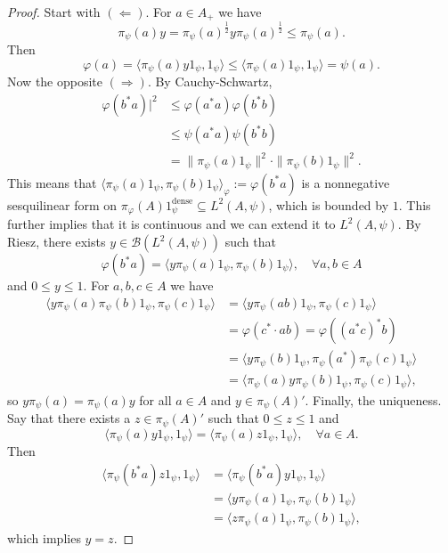 \documentclass[10pt, a4paper]{article}
\newenvironment{noticeC}{%
  \tcolorbox[%
  notitle,
  empty,
  enhanced,  %
  breakable,
  coltext=black, 
  fontupper=\rmfamily,
  noparskip,
  sharp corners,
  boxrule=-1pt,  %
  frame hidden,
  left=7pt,  %
  right=7pt,
  top=5pt,
  bottom=5pt,
  before skip=2.5ex plus 2pt,
  after skip=2.5ex plus 2pt,
  overlay unbroken and last={%
  },
  ]}
{\endtcolorbox}
\newenvironment{myproof}%
  {\begin{noticeC}\begin{proof}}%
  {\end{proof}\end{noticeC}}
\begin{document}
\begin{myproof}
  Start with $(\Leftarrow)$. For $a \in A_+$ we have 
  $$\pi_{\psi} (a) y = \pi_{\psi} (a)^{\frac{1}{2}} y \pi_{\psi} (a) ^{\frac{1}{2}} \leq \pi_{\psi} (a).$$
  Then 
  $$\varphi(a) = \langle \pi_{\psi} (a) y 1_{\psi}, 1_{\psi} \rangle \leq \langle \pi_{\psi} (a) 1_{\psi}, 1_{\psi}\rangle = \psi(a).$$
  Now the opposite $(\Rightarrow)$. By Cauchy-Schwartz,
  \begin{align*}
    \varphi (b^* a)|^2 &\leq \varphi(a^* a) \varphi(b^* b)\\
    &\leq \psi (a^* a) \psi (b^* b)\\
    &= \| \pi_{\psi} (a) 1_{\psi} \|^2 \cdot \| \pi_{\psi} (b) 1_{\psi} \|^2.
  \end{align*}
  This means that $\langle \pi_{\psi} (a) 1_{\psi}, \pi_{\psi} (b) 1_{\psi}\rangle_{\varphi} := \varphi (b^* a)$ is a nonnegative sesquilinear form on 
  $\pi_{\varphi} (A) 1_{\psi}^{\mathrm{dense}} \subseteq L^2 (A, \psi)$, which is bounded by $1$.
  This further implies that it is continuous and we can extend it to $L^2 (A, \psi)$.
  By Riesz, there exists $y \in \mathcal{B} (L^2 (A, \psi))$ such that 
  $$\varphi(b^* a) = \langle y \pi_{\psi} (a) 1_{\psi} , \pi_{\psi} (b) 1_{\psi} \rangle,\quad \forall a, b \in A$$
  and $0 \leq y \leq 1$. For $a, b, c \in A$ we have 
  \begin{align*}
    \langle y \pi_{\psi} (a) \pi_{\psi} (b) 1_{\psi}, \pi_{\psi} (c) 1_{\psi}\rangle &= \langle y \pi_{\psi} (ab) 1_{\psi}, \pi_{\psi} (c) 1_{\psi} \rangle\\
    &= \varphi(c^* \cdot ab) = \varphi ((a^* c)^* b)\\
    &= \langle y \pi_{\psi} (b) 1_{\psi}, \pi_{\psi} (a^*) \pi_{\psi} (c) 1_{\psi}\rangle\\
    &= \langle \pi_{\psi} (a) y \pi_{\psi} (b) 1_{\psi}, \pi_{\psi} (c) 1_{\psi}\rangle,
  \end{align*}
  so $y \pi_{\psi} (a) = \pi_{\psi} (a) y$ for all $a \in A$ and $y \in \pi_{\psi} (A) '$.
  Finally, the uniqueness. Say that there exists a $z \in \pi_{\psi} (A)'$ such that $0 \leq z \leq 1$ and 
  $$\langle \pi_{\psi} (a) y 1_{\psi}, 1_{\psi} \rangle = \langle \pi_{\psi} (a) z 1_{\psi}, 1_{\psi} \rangle,\quad \forall a \in A.$$
  Then 
  \begin{align*}
    \langle \pi_{\psi} (b^* a) z 1_{\psi}, 1_{\psi} \rangle &= \langle \pi_{\psi} (b^* a) y 1_{\psi}, 1_{\psi} \rangle \\
    &= \langle y \pi_{\psi} (a) 1_{\psi}, \pi_{\psi} (b) 1_{\psi} \rangle\\
    &= \langle z \pi_{\psi} (a) 1_{\psi}, \pi_{\psi} (b) 1_{\psi} \rangle,  
  \end{align*}
  which implies $y = z$.
\end{myproof}
\end{document}
